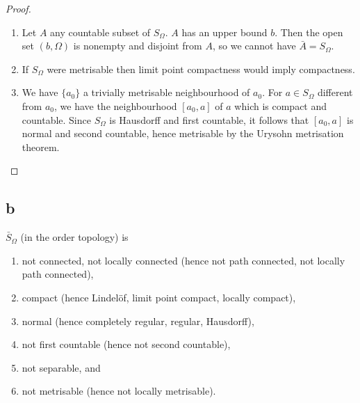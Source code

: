 \begin{proof}
\begin{enumerate}[leftmargin=*]
  \item Let $A$ any countable subset of $S_\Omega$. $A$ has an upper bound $b$. Then the open set $(b, \Omega)$ is nonempty and disjoint from $A$, so we cannot have $\bar A = S_\Omega$.
  \item If $S_\Omega$ were metrisable then limit point compactness would imply compactness.
  \item We have $\{a_0\}$ a trivially metrisable neighbourhood of $a_0$. For $a \in S_\Omega$ different from $a_0$, we have the neighbourhood $[a_0,a]$ of $a$ which is compact and countable. Since $S_\Omega$ is Hausdorff and first countable, it follows that $[a_0,a]$ is normal and second countable, hence metrisable by the Urysohn metrisation theorem. \qedhere
  \end{enumerate}
\end{proof}


\subsection*{b}
  $\bar S_\Omega$ (in the order topology) is
  \begin{enumerate}
  \item not connected, not locally connected (hence not path connected, not locally path connected),
  \item compact (hence Lindel\"of, limit point compact, locally compact),
  \item normal (hence completely regular, regular, Hausdorff),
  \item not first countable (hence not second countable),
  \item not separable, and
  \item not metrisable (hence not locally metrisable).
  \end{enumerate}


